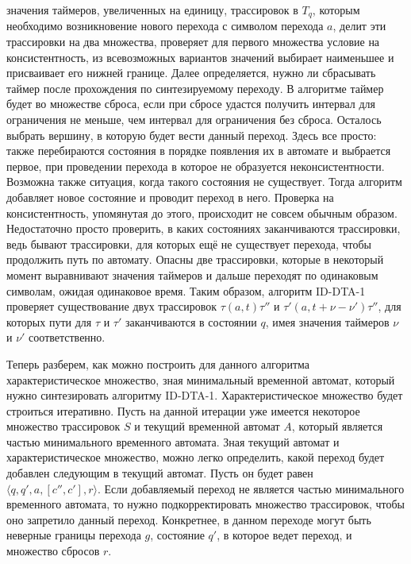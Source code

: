\documentclass[times,specification,annotation]{itmo-student-thesis}
\begin{document}
значения таймеров, увеличенных на единицу, трассировок в $T_q$, которым необходимо возникновение нового перехода с символом перехода $a$, делит эти трассировки на два множества, 
проверяет для первого множества условие на консистентность, из всевозможных вариантов значений выбирает наименьшее и присваивает его нижней границе. Далее определяется, нужно ли 
сбрасывать таймер после прохождения по синтезируемому переходу. В алгоритме таймер будет во множестве сброса, если при сбросе удастся получить интервал для ограничения не меньше, чем
интервал для ограничения без сброса. Осталось выбрать вершину, в которую будет вести данный переход. Здесь все просто: также перебираются состояния в порядке появления их в автомате и
выбрается первое, при проведении перехода в которое не образуется неконсистентности. Возможна также ситуация, когда такого состояния не существует. Тогда алгоритм добавляет новое состояние и проводит 
переход в него. Проверка на консистентность, упомянутая до этого, происходит не совсем обычным образом. Недостаточно просто проверить, в каких состояниях заканчиваются трассировки, ведь бывают
трассировки, для которых ещё не существует перехода, чтобы продолжить путь по автомату. Опасны две трассировки, которые в некоторый момент выравнивают значения таймеров и дальше переходят
по одинаковым символам, ожидая одинаковое время. Таким образом, алгоритм ID-DTA-1 проверяет существование двух трассировок $\tau(a, t)\tau''$ и $\tau'(a, t + \nu - \nu')\tau''$, для
которых пути для $\tau$ и $\tau'$ заканчиваются в состоянии $q$, имея значения таймеров $\nu$ и $\nu'$ соответственно. 

Теперь разберем, как можно построить для данного алгоритма характеристическое множество, зная минимальный временной автомат, который нужно синтезировать алгоритму ID-DTA-1. Характеристическое
множество будет строиться итеративно. Пусть на данной итерации уже имеется некоторое множество трассировок $S$ и текущий временной автомат $A$, который является частью минимального временного
автомата. Зная текущий автомат и характеристическое множество, можно легко определить, какой переход будет добавлен следующим в текущий автомат. 
Пусть он будет равен $\langle q, q', a, \left[ c'', c' \right], r \rangle$.  Если добавляемый переход не является частью минимального временного автомата, 
то нужно подкорректировать множество трассировок, чтобы оно запретило данный переход. 
Конкретнее, в данном переходе могут быть неверные границы перехода $g$, состояние $q'$, в которое ведет переход, и множество сбросов $r$.
\end{document}
